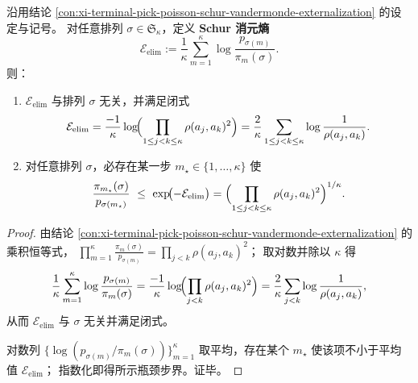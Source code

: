 \begin{proposition}\label{prop:xi-schur-elimination-entropy-permutation-invariant-bottleneck}
沿用结论 \ref{con:xi-terminal-pick-poisson-schur-vandermonde-externalization} 的设定与记号。
对任意排列 \(\sigma\in\mathfrak S_\kappa\)，定义 \textbf{Schur 消元熵}
\[
\mathcal E_{\mathrm{elim}}
:=\frac1\kappa\sum_{m=1}^{\kappa}\log\frac{p_{\sigma(m)}}{\pi_m(\sigma)}.
\]
则：
\begin{enumerate}
  \item \(\mathcal E_{\mathrm{elim}}\) 与排列 \(\sigma\) 无关，并满足闭式
  \[
  \mathcal E_{\mathrm{elim}}
  =\frac{-1}{\kappa}\log\!\Bigl(\prod_{1\le j<k\le\kappa}\rho(a_j,a_k)^2\Bigr)
  =\frac{2}{\kappa}\sum_{1\le j<k\le\kappa}\log\frac{1}{\rho(a_j,a_k)}.
  \]
  \item 对任意排列 \(\sigma\)，必存在某一步 \(m_\star\in\{1,\dots,\kappa\}\) 使
  \[
  \frac{\pi_{m_\star}(\sigma)}{p_{\sigma(m_\star)}}
  \ \le\
  \exp\!\bigl(-\mathcal E_{\mathrm{elim}}\bigr)
  =\Bigl(\prod_{1\le j<k\le\kappa}\rho(a_j,a_k)^2\Bigr)^{1/\kappa}.
  \]
\end{enumerate}
\end{proposition}
\begin{proof}
由结论 \ref{con:xi-terminal-pick-poisson-schur-vandermonde-externalization} 的乘积恒等式，
\(
\prod_{m=1}^{\kappa}\frac{\pi_m(\sigma)}{p_{\sigma(m)}}=\prod_{j<k}\rho(a_j,a_k)^2
\)；
取对数并除以 \(\kappa\) 得
\[
\frac1\kappa\sum_{m=1}^{\kappa}\log\frac{p_{\sigma(m)}}{\pi_m(\sigma)}
=\frac{-1}{\kappa}\log\!\Bigl(\prod_{j<k}\rho(a_j,a_k)^2\Bigr)
=\frac{2}{\kappa}\sum_{j<k}\log\frac1{\rho(a_j,a_k)},
\]
从而 \(\mathcal E_{\mathrm{elim}}\) 与 \(\sigma\) 无关并满足闭式。
\par
对数列 \(\{\log(p_{\sigma(m)}/\pi_m(\sigma))\}_{m=1}^{\kappa}\) 取平均，存在某个 \(m_\star\) 使该项不小于平均值 \(\mathcal E_{\mathrm{elim}}\)；
指数化即得所示瓶颈步界。证毕。
\end{proof}

